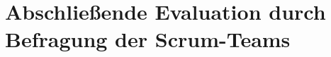 \chapter{Abschließende Evaluation durch Befragung der Scrum-Teams}
\label{cha:abschliessende_evaluation}
